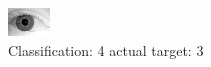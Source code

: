 \begin{figure}[h!]
\begin{center}
\includegraphics[width=0.60\columnwidth]{figures/ID2207_class_4_target_3.png}
\end{center}
\caption{ Classification: 4 actual target: 3}
\label{fig:ID2207_class_4_target_3}
\end{figure}
